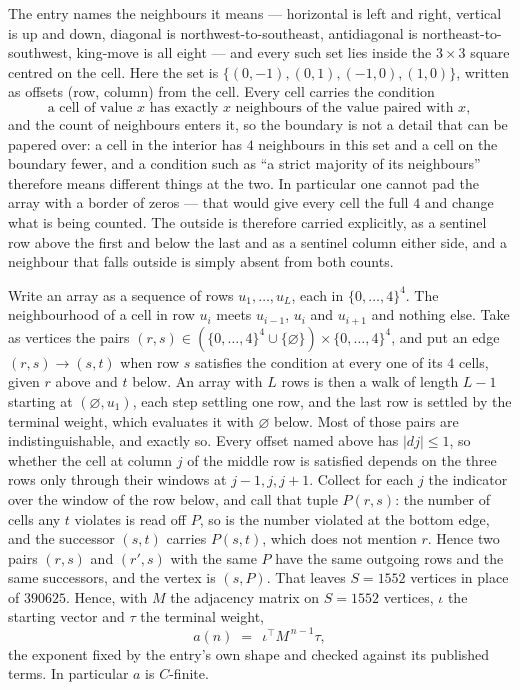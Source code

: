 \documentclass[11pt,a4paper]{article}
\theoremstyle{plain}
\theoremstyle{definition}
\begin{document}
The entry names the neighbours it means --- horizontal is left and right, vertical is up and
down, diagonal is northwest-to-southeast, antidiagonal is northeast-to-southwest, king-move is
all eight --- and every such set lies inside the $3\times3$ square centred on the cell. Here
the set is $\{(0,-1), (0,1), (-1,0), (1,0)\}$, written as offsets (row, column) from the cell. Every cell carries
the condition
\[
\text{a cell of value }x\text{ has exactly }x\text{ neighbours of the value paired with }x,
\]
and the count of neighbours enters it, so the boundary is not a detail that can be papered
over: a cell in the interior has $4$ neighbours in this set and a cell on the boundary
fewer, and a condition such as ``a strict majority of its neighbours'' therefore means
different things at the two. In particular one cannot pad the array with a border of zeros ---
that would give every cell the full $4$ and change what is being counted. The outside is
therefore carried
explicitly, as a sentinel row above the first and below the last and as a sentinel column
either side, and a neighbour that falls outside is simply absent from both counts.

Write an array as a sequence of rows $u_1,\dots,u_L$, each in
$\{0,\dots,4\}^{4}$. The neighbourhood of a cell in row $u_i$ meets $u_{i-1}$,
$u_i$ and $u_{i+1}$ and nothing else. Take as vertices the pairs
$(r,s)\in(\{0,\dots,4\}^{4}\cup\{\varnothing\})\times\{0,\dots,4\}^{4}$,
and put an edge $(r,s)\to(s,t)$ when row $s$ satisfies the condition at every one of its
$4$ cells, given $r$ above and $t$ below. An array with $L$ rows is then a walk of length
$L-1$ starting at $(\varnothing,u_1)$, each step settling one row, and the last row is
settled by the terminal weight, which evaluates it with $\varnothing$ below. Most of those pairs are indistinguishable, and exactly so. Every offset named above has $|dj|\le 1$, so whether the cell at column $j$ of the middle row is satisfied depends on the three rows only through their windows at $j-1,j,j+1$. Collect for each $j$ the indicator over the window of the row below, and call that tuple $P(r,s)$: the number of cells any $t$ violates is read off $P$, so is the number violated at the bottom edge, and the successor $(s,t)$ carries $P(s,t)$, which does not mention $r$. Hence two pairs $(r,s)$ and $(r',s)$ with the same $P$ have the same outgoing rows and the same successors, and the vertex is $(s,P)$. That leaves $S=1552$ vertices in place of $390625$. Hence,
with $M$ the adjacency matrix on $S=1552$ vertices, $\iota$ the starting vector and $\tau$ the
terminal weight,
\[
a(n)\;=\;\,\iota^{\!\top}M^{\,n-1}\tau ,
\]
the exponent fixed by the entry's own shape and checked against its published terms. In
particular $a$ is $C$-finite.
\end{document}
